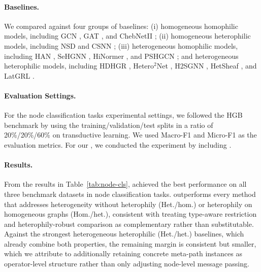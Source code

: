 \paragraph{Baselines.} We compared \method{} against four groups of baselines: (i) homogeneous homophilic models, including GCN
\cite{kipf2017gcn}, GAT \cite{velickovic2018gat}, and ChebNetII \cite{he2022chebnetii}; (ii) homogeneous heterophilic models, including NSD
\cite{bodnar2022neural} and CSNN \cite{ribeiro2026cooperative}; (iii)
heterogeneous homophilic models, including HAN \cite{wang2019han}, SeHGNN \cite{yang2023sehgnn},
HiNormer \cite{mao2023hinormer}, and PSHGCN \cite{he2024spectral}; and heterogeneous heterophilic models, including HDHGR \cite{guo2023homophily}, Hetero$^2$Net \cite{li2025hetero2net}, H2SGNN
\cite{lu2026addressing}, HetSheaf \cite{braithwaite2024heterogeneous}, and LatGRL
\cite{shen2025heterophily}.


\paragraph{Evaluation Settings.} For the node classification tasks experimental settings, we followed the HGB benchmark \cite{lv2021hgb} by using the training/validation/test splits in a ratio of 20\%/20\%/60\% on transductive learning. We used Macro-F1 and Micro-F1 as the evaluation metrics. For our \method{}, we conducted the experiment by including \ampss{}. 

\paragraph{Results.}
From the results in Table~\ref{tab:node-cls}, \method{} achieved the best performance on all three benchmark datasets in node classification tasks. \method{} outperforms every method that addresses heterogeneity without heterophily (Het./hom.) or heterophily on homogeneous graphs (Hom./het.), consistent with treating type-aware restriction and heterophily-robust comparison as complementary rather than substitutable. Against the strongest heterogeneous heterophilic (Het./het.) baselines, which already combine both properties, the remaining margin is consistent but smaller, which we attribute to \method{} additionally retaining concrete meta-path instances as operator-level structure rather than only adjusting node-level message passing.

